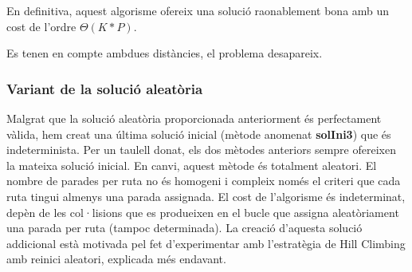 En definitiva, aquest algorisme ofereix una solució raonablement bona amb un cost de l'ordre $\Theta(K * P)$.


 {Es tenen en compte ambdues distàncies, el problema desapareix.}

\subsubsection{Variant de la solució aleatòria}

Malgrat que la solució aleatòria proporcionada anteriorment és perfectament vàlida, hem creat una última solució inicial (mètode anomenat \textbf{solIni3}) que és indeterminista. Per un taulell donat, els dos mètodes anteriors sempre ofereixen la mateixa solució inicial. En canvi, aquest mètode és totalment aleatori. El nombre de parades per ruta no és homogeni i compleix només el criteri que cada ruta tingui almenys una parada assignada. El cost de l'algorisme és indeterminat, depèn de les col·lisions que es produeixen en el bucle que assigna aleatòriament una parada per ruta (tampoc determinada). La creació d'aquesta solució addicional està motivada pel fet d'experimentar amb l'estratègia de Hill Climbing amb reinici aleatori, explicada més endavant.

